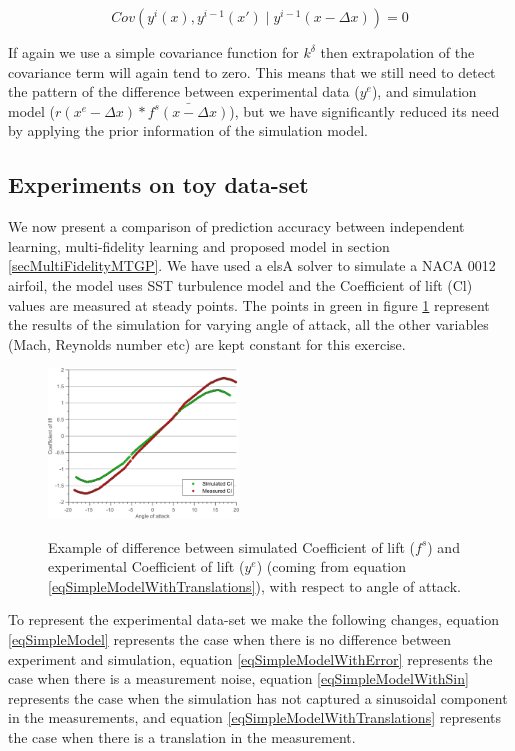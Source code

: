\begin{mdframed}[hidealllines=true,backgroundcolor=blue!20]
\begin{equation}\label{eqDelayedMarkovProperty}
         Cov(y^{i}(x), y^{i-1}(x') \mid y^{i-1}(x - \Delta x)) = 0
\end{equation}

If again we use a simple covariance function for $k^{\delta}$ then extrapolation of the covariance term will again tend to zero. This means that we still need to detect the pattern of the difference between experimental data ($y^e$), and simulation model ($r(x^{e} -\Delta x )*\bar{f^{s}(x - \Delta x)}$), but we have significantly reduced its need by applying the prior information of the simulation model. 
\end{mdframed}

\subsection{Experiments on toy data-set}\label{subsecExpToyDataset}
We now present a comparison of prediction accuracy between independent learning, multi-fidelity learning and proposed model in section \ref{secMultiFidelityMTGP}. We have used a elsA solver to simulate a NACA 0012 airfoil, the model uses SST turbulence model and the Coefficient of lift (Cl) values are measured at steady points. The points in green in figure \ref{subFigmeasuredVssimulatedCl} represent the results of the simulation for varying angle of attack, all the other variables (Mach, Reynolds number etc) are kept constant for this exercise. 

\begin{figure}[!ht]
  \centering
    \includegraphics[width=0.45\textwidth]
        {images/part3/measuredVssimulatedCl}
        \label{subFigmeasuredVssimulatedCl}
       \caption{Example of difference between simulated Coefficient of lift ($f^s$) and experimental Coefficient of lift ($y^e$) (coming from equation \ref{eqSimpleModelWithTranslations}), with respect to angle of attack.}
\end{figure}

To represent the experimental data-set we make the following changes, equation \ref{eqSimpleModel} represents the case when there is no difference between experiment and simulation, equation \ref{eqSimpleModelWithError} represents the case when there is a measurement noise, equation \ref{eqSimpleModelWithSin} represents the case when the simulation has not captured a sinusoidal component in the measurements, and equation \ref{eqSimpleModelWithTranslations} represents the case when there is a translation in the measurement.  

